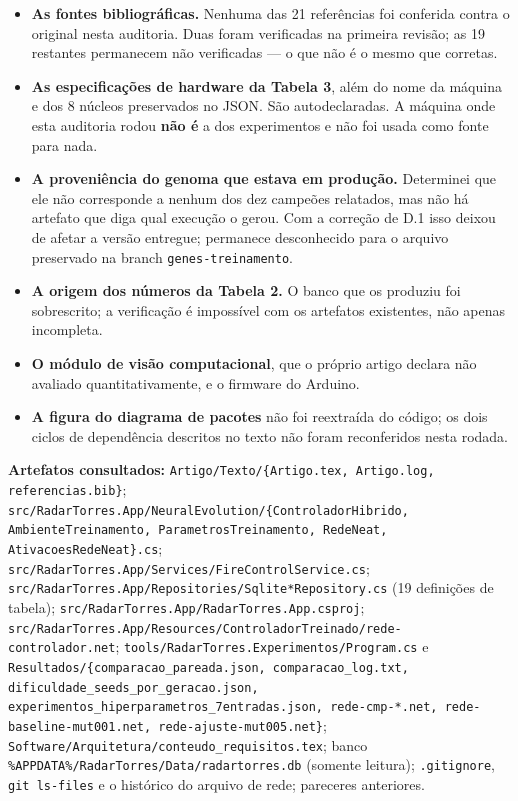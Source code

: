 \documentclass[11pt,a4paper]{article}
\begin{document}
\begin{itemize}
  \item \textbf{As fontes bibliográficas.} Nenhuma das 21 referências foi conferida contra o
  original nesta auditoria. Duas foram verificadas na primeira revisão; as 19 restantes permanecem
  não verificadas --- o que não é o mesmo que corretas.
  \item \textbf{As especificações de hardware da Tabela 3}, além do nome da máquina e dos 8 núcleos
  preservados no JSON. São autodeclaradas. A máquina onde esta auditoria rodou \textbf{não é} a dos
  experimentos e não foi usada como fonte para nada.
  \item \textbf{A proveniência do genoma que estava em produção.} Determinei que ele não corresponde
  a nenhum dos dez campeões relatados, mas não há artefato que diga qual execução o gerou. Com a
  correção de D.1 isso deixou de afetar a versão entregue; permanece desconhecido para o arquivo
  preservado na branch \texttt{genes-treinamento}.
  \item \textbf{A origem dos números da Tabela 2.} O banco que os produziu foi sobrescrito; a
  verificação é impossível com os artefatos existentes, não apenas incompleta.
  \item \textbf{O módulo de visão computacional}, que o próprio artigo declara não avaliado
  quantitativamente, e o firmware do Arduino.
  \item \textbf{A figura do diagrama de pacotes} não foi reextraída do código; os dois ciclos de
  dependência descritos no texto não foram reconferidos nesta rodada.
\end{itemize}

\textbf{Artefatos consultados:} \texttt{Artigo/Texto/\{Artigo.tex, Artigo.log, referencias.bib\}};
\texttt{src/RadarTorres.App/NeuralEvolution/\{ControladorHibrido, AmbienteTreinamento,
ParametrosTreinamento, RedeNeat, AtivacoesRedeNeat\}.cs};
\texttt{src/RadarTorres.App/Services/FireControlService.cs};
\texttt{src/RadarTorres.App/Repositories/Sqlite*Repository.cs} (19 definições de tabela);
\texttt{src/RadarTorres.App/RadarTorres.App.csproj};
\texttt{src/RadarTorres.App/Resources/ControladorTreinado/rede-controlador.net};
\texttt{tools/RadarTorres.Experimentos/Program.cs} e
\texttt{Resultados/\{comparacao\_pareada.json, comparacao\_log.txt,
dificuldade\_seeds\_por\_geracao.json, experimentos\_hiperparametros\_7entradas.json,
rede-cmp-*.net, rede-baseline-mut001.net, rede-ajuste-mut005.net\}};
\texttt{Software/Arquitetura/conteudo\_requisitos.tex}; banco
\texttt{\%APPDATA\%/RadarTorres/Data/radartorres.db} (somente leitura);
\texttt{.gitignore}, \texttt{git ls-files} e o histórico do arquivo de rede; pareceres anteriores.
\end{document}
